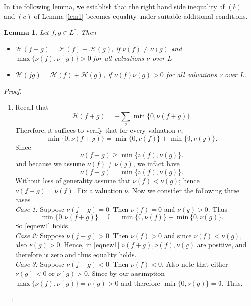 \documentclass[12pt]{amsart}
\newtheorem{lemma}[theorem]{Lemma}
\begin{document}
    In the following lemma, we establish that the right hand side inequality of $(b)$ and $(c)$ of Lemma \ref{lem1} becomes equality under suitable additional conditions.
    \begin{lemma}\label{lemequality}
    Let $f,g\in L^{*}$. Then
        \begin{itemize}
            \item[(i)] $\mathcal{H}(f+g)=\mathcal{H}(f)+\mathcal{H}(g)$, if $\nu(f)\neq \nu (g)$ and $\max \{\nu(f),\nu (g)\}>0$ for all valuations $\nu$ over $L$.
            \item[(ii)] $\mathcal{H}(fg)=\mathcal{H}(f)+\mathcal{H}(g)$, if $\nu(f)\nu (g)>0$ for all valuations $\nu$ over $L$. 
        \end{itemize}
    \end{lemma}
    \begin{proof}
        \begin{enumerate}
            \item[($i$)] Recall that
            \[\mathcal{H}(f+g)=- \sum_{\nu} \min \{ 0,\nu (f+g)\}.\]
            Therefore, it suffices to verify that for every valuation $\nu$, 
            \begin{equation}\label{eqnew1}
                \min \{ 0,\nu (f+g)\}=\min \{ 0,\nu (f)\}+\min \{ 0,\nu (g)\}.
            \end{equation} Since 
            \begin{equation*}
                \nu(f+g)\geq \min\{\nu(f),\nu(g)\}.
            \end{equation*}and because we assume $\nu(f)\neq \nu(g)$, we infact have 
            \begin{equation*}
                \nu(f+g)= \min\{\nu(f),\nu(g)\}.
            \end{equation*} Without loss of generality assume that $\nu(f)<\nu(g)$; hence $\nu(f+g)=\nu(f)$. Fix a valuation $\nu$. Now we consider the following three cases.\\
            \textit{Case 1:} Suppose  $\nu(f+g)=0.$ Then $\nu(f)=0$ and $\nu(g)>0$. Thus
            \[
            \min \{0, \nu(f+g)\}=0=\min \{0, \nu(f)\}+\min \{0, \nu(g)\}.
            \]  So \eqref{eqnew1} holds.\\
            \textit{Case 2:} Suppose $\nu(f+g)>0$. Then $\nu(f)>0$ and since $\nu(f)<\nu(g)$, also $\nu(g)>0$. Hence, in \eqref{eqnew1} $\nu(f+g),\nu(f),\nu(g)$ are positive, and therefore is zero and thus equality holds.\\
            \textit{Case 3:} Suppose $\nu(f+g)<0$. Then $\nu(f)<0$. Also note that either $\nu(g)<0$ or $\nu(g)>0$. Since by our assumption $\max \{\nu(f), \nu(g)\}=\nu(g)>0$ and therefore $\min \{0,\nu (g)\}=0$. Thus,

\end{enumerate}
\end{proof}
\end{document}
